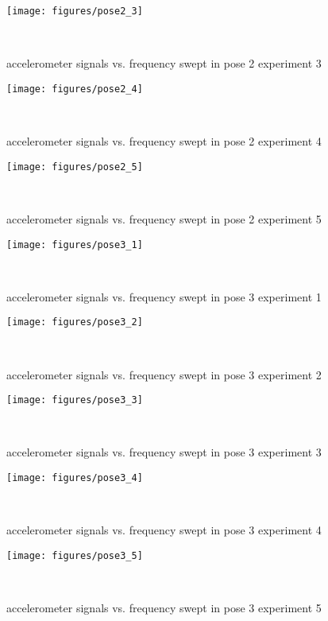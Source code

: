 \documentclass{sigchi}
\begin{document}
\begin{figure*}
  \centering
  \texttt{[image: figures/pose2\_3]}
  \caption{accelerometer signals vs. frequency swept in pose 2 experiment 3}
    ~\label{fig:pose2_3}
\end{figure*}

\begin{figure*}
  \centering
  \texttt{[image: figures/pose2\_4]}
  \caption{accelerometer signals vs. frequency swept in pose 2 experiment 4}
    ~\label{fig:pose2_4}
\end{figure*}

\begin{figure*}
  \centering
  \texttt{[image: figures/pose2\_5]}
  \caption{accelerometer signals vs. frequency swept in pose 2 experiment 5}
    ~\label{fig:pose2_5}
\end{figure*}

\begin{figure*}
  \centering
  \texttt{[image: figures/pose3\_1]}
  \caption{accelerometer signals vs. frequency swept in pose 3 experiment 1}
    ~\label{fig:pose3_1}
\end{figure*}

\begin{figure*}
  \centering
  \texttt{[image: figures/pose3\_2]}
  \caption{accelerometer signals vs. frequency swept in pose 3 experiment 2}
    ~\label{fig:pose3_2}
\end{figure*}

\begin{figure*}
  \centering
  \texttt{[image: figures/pose3\_3]}
  \caption{accelerometer signals vs. frequency swept in pose 3 experiment 3}
    ~\label{fig:pose3_3}
\end{figure*}

\begin{figure*}
  \centering
  \texttt{[image: figures/pose3\_4]}
  \caption{accelerometer signals vs. frequency swept in pose 3 experiment 4}
    ~\label{fig:pose3_4}
\end{figure*}

\begin{figure*}
  \centering
  \texttt{[image: figures/pose3\_5]}
  \caption{accelerometer signals vs. frequency swept in pose 3 experiment 5}
    ~\label{fig:pose3_5}
\end{figure*}
\end{document}

